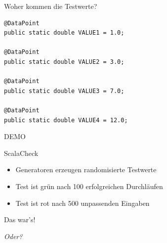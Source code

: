\begin{frame}[fragile]{Woher kommen die Testwerte?}
\begin{lstlisting}
@DataPoint
public static double VALUE1 = 1.0;

@DataPoint
public static double VALUE2 = 3.0;

@DataPoint
public static double VALUE3 = 7.0;

@DataPoint
public static double VALUE4 = 12.0;
\end{lstlisting}
\end{frame}

\begin{frame}{}
\begin{center}
DEMO
\end{center}
\end{frame}

\begin{frame}[fragile]{ScalaCheck}
	\begin{itemize}
		\item Generatoren erzeugen randomisierte Testwerte
		\item Test ist grün nach 100 erfolgreichen Durchläufen
		\item Test ist rot nach 500 unpassenden Eingaben
	\end{itemize}
\end{frame}

\begin{frame}
\begin{center}\Huge
Das war's!
\end{center}
\pause
\vspace{.1cm}
\begin{flushright}\Huge
\itshape Oder?
\end{flushright}
\end{frame}
